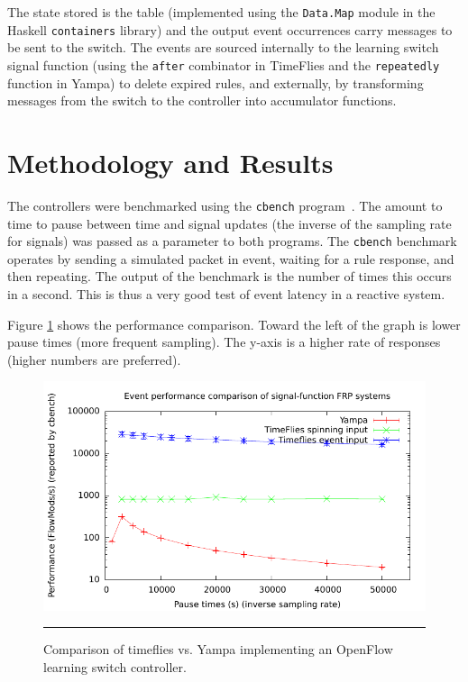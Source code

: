 The state stored is the table (implemented using the {\tt Data.Map} module in the
Haskell {\tt containers} library) and the output event occurrences carry messages
to be sent to the switch. The events are sourced internally to the learning
switch signal function (using the {\tt after} combinator in TimeFlies and the {\tt repeatedly}
function in Yampa) to delete expired rules, and externally, by transforming messages
from the switch to the controller into accumulator functions.

\section{Methodology and Results}
\label{section:Evaluation_and_Comparisons-Methodology_and_Results}

The controllers were benchmarked using the {\tt cbench} program~\cite{cbench}. The
amount to time to pause between time and signal updates (the inverse of the sampling rate for signals)
was passed as a parameter to both programs. The {\tt cbench} benchmark operates by sending a simulated packet in
event, waiting for a rule response, and then repeating. The output of the benchmark
is the number of times this occurs in a second. This is thus a very good test of
event latency in a reactive system.

Figure \ref{fig:timeflies-yampa-comparison} shows the performance comparison.
Toward the left of the graph is lower pause times (more frequent sampling). The
y-axis is a higher rate of responses (higher numbers are preferred). 

\begin{figure}
\includegraphics{graph}
\hrule
\caption{Comparison of timeflies vs. Yampa implementing an OpenFlow learning switch controller.}
\label{fig:timeflies-yampa-comparison}
\end{figure}

